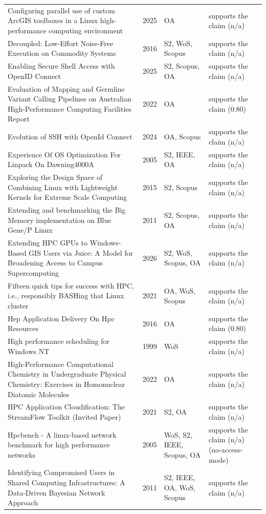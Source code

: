 \begin{longtable}{@{}%
  >{\raggedright\arraybackslash}p{}c%
  >{\raggedright\arraybackslash}p{}%
  >{\raggedright\arraybackslash}p{}@{}}
Configuring parallel use of custom ArcGIS toolboxes in a Linux high-performance computing environment & 2025 & OA & supports the claim (n/a) \\
Decoupled: Low-Effort Noise-Free Execution on Commodity Systems & 2016 & S2, WoS, Scopus & supports the claim (n/a) \\
Enabling Secure Shell Access with OpenID Connect & 2025 & S2, Scopus, OA & supports the claim (n/a) \\
Evaluation of Mapping and Germline Variant Calling Pipelines on Australian High-Performance Computing Facilities Report & 2022 & OA & supports the claim (0.80) \\
Evolution of SSH with OpenId Connect & 2024 & OA, Scopus & supports the claim (n/a) \\
Experience Of OS Optimization For Linpack On Dawning4000A & 2005 & S2, IEEE, OA & supports the claim (n/a) \\
Exploring the Design Space of Combining Linux with Lightweight Kernels for Extreme Scale Computing & 2015 & S2, Scopus & supports the claim (n/a) \\
Extending and benchmarking the \textquotedbl{}Big Memory\textquotedbl{} implementation on Blue Gene/P Linux & 2011 & S2, Scopus, OA & supports the claim (n/a) \\
Extending HPC GPUs to Windows-Based GIS Users via Juice: A Model for Broadening Access to Campus Supercomputing & 2026 & S2, WoS, Scopus, OA & supports the claim (n/a) \\
Fifteen quick tips for success with HPC, i.e., responsibly BASHing that Linux cluster & 2021 & OA, WoS, Scopus & supports the claim (n/a) \\
Hep Application Delivery On Hpc Resources & 2016 & OA & supports the claim (0.80) \\
High performance scheduling for Windows NT & 1999 & WoS & supports the claim (n/a) \\
High-Performance Computational Chemistry in Undergraduate Physical Chemistry: Exercises in Homonuclear Diatomic Molecules & 2022 & OA & supports the claim (n/a) \\
HPC Application Cloudification: The StreamFlow Toolkit (Invited Paper) & 2021 & S2, OA & supports the claim (n/a) \\
Hpcbench - A linux-based network benchmark for high performance networks & 2005 & WoS, S2, IEEE, Scopus, OA & supports the claim (n/a) (no-access-mode) \\
Identifying Compromised Users in Shared Computing Infrastructures: A Data-Driven Bayesian Network Approach & 2011 & S2, IEEE, OA, WoS, Scopus & supports the claim (n/a) \\

\end{longtable}

